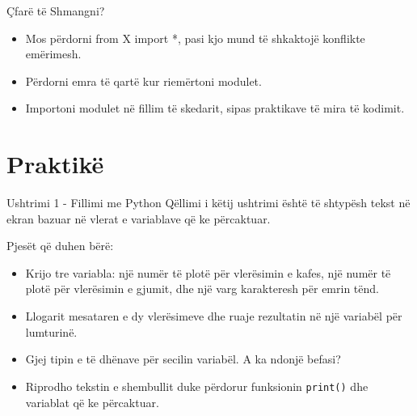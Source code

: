 \documentclass[
  ignorenonframetext,
]{beamer}
\begin{document}
\begin{frame}{Çfarë të Shmangni?}
\protect\hypertarget{uxe7faruxeb-tuxeb-shmangni}{}
\begin{itemize}
\item
  Mos përdorni from X import *, pasi kjo mund të shkaktojë konflikte
  emërimesh.
\item
  Përdorni emra të qartë kur riemërtoni modulet.
\item
  Importoni modulet në fillim të skedarit, sipas praktikave të mira të
  kodimit.
\end{itemize}
\end{frame}

\hypertarget{praktikuxeb}{%
\section{Praktikë}\label{praktikuxeb}}

\begin{frame}{Ushtrimi 1 - Fillimi me Python}
\protect\hypertarget{ushtrimi-1---fillimi-me-python}{}
Qëllimi i këtij ushtrimi është të shtypësh tekst në ekran bazuar në
vlerat e variablave që ke përcaktuar.
\end{frame}

\begin{frame}[fragile]{Pjesët që duhen bërë:}
\protect\hypertarget{pjesuxebt-quxeb-duhen-buxebruxeb}{}
\begin{itemize}
\item
  Krijo tre variabla: një numër të plotë për vlerësimin e kafes, një
  numër të plotë për vlerësimin e gjumit, dhe një varg karakteresh për
  emrin tënd.
\item
  Llogarit mesataren e dy vlerësimeve dhe ruaje rezultatin në një
  variabël për lumturinë.
\item
  Gjej tipin e të dhënave për secilin variabël. A ka ndonjë befasi?
\item
  Riprodho tekstin e shembullit duke përdorur funksionin
  \texttt{print()} dhe variablat që ke përcaktuar.
\end{itemize}
\end{frame}
\end{document}
